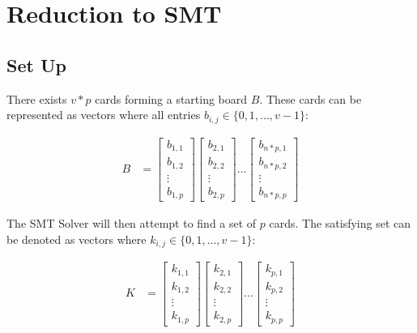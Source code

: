 \documentclass[pageno]{jpaper}
\begin{document}
\section{Reduction to SMT}

\subsection{Set Up}
 There exists $v*p$ cards forming a starting board $B$. These cards can be represented as vectors where all entries $b_{i,j} \in \{0,1, ... , v-1\}$:

\begin{align}
    B &= \begin{bmatrix}
           b_{1,1} \\
           b_{1,2} \\
           \vdots \\
           b_{1,p}
         \end{bmatrix}
         \begin{bmatrix}
           b_{2,1} \\
           b_{2,2} \\
           \vdots \\
           b_{2,p}
         \end{bmatrix} ... 
          \begin{bmatrix}
           b_{n*p,1} \\
           b_{n*p,2} \\
           \vdots \\
           b_{n*p,p}
         \end{bmatrix}
  \end{align}
  
The SMT Solver will then attempt to find a set of $p$ cards. The satisfying set can be denoted as vectors where $k_{i,j} \in \{0,1, ... , v-1\}$:

\begin{align}
    K &= \begin{bmatrix}
           k_{1,1} \\
           k_{1,2} \\
           \vdots \\
           k_{1,p}
         \end{bmatrix}
         \begin{bmatrix}
           k_{2,1} \\
           k_{2,2} \\
           \vdots \\
           k_{2,p}
         \end{bmatrix} ... 
          \begin{bmatrix}
           k_{p,1} \\
           k_{p,2} \\
           \vdots \\
           k_{p,p}
         \end{bmatrix}
  \end{align}
\end{document}

